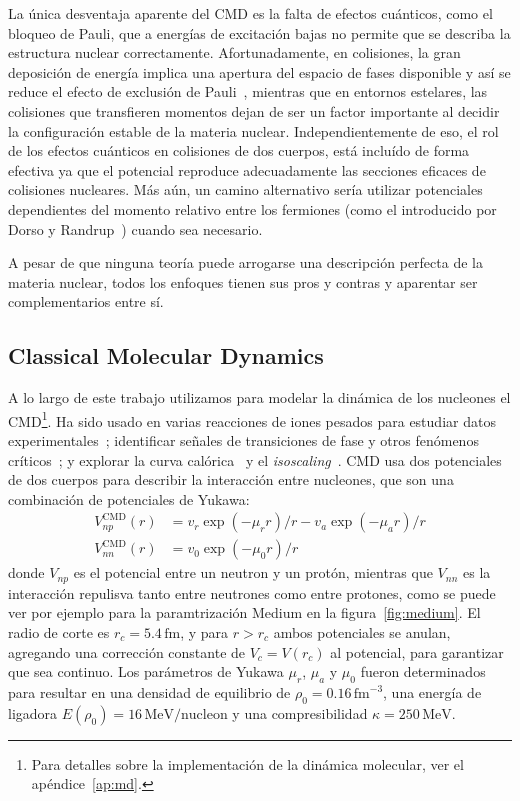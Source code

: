La única desventaja aparente del CMD es la falta de efectos cuánticos, como el bloqueo de Pauli, que a energías de excitación bajas no permite que se describa la estructura nuclear correctamente.
Afortunadamente, en colisiones, la gran deposición de energía implica una apertura del espacio de fases disponible y así se reduce el efecto de exclusión de Pauli~\cite{lopez_lectures_2000}, mientras que en entornos estelares, las colisiones que transfieren momentos dejan de ser un factor importante al decidir la configuración estable de la materia nuclear.
Independientemente de eso, el rol de los efectos cuánticos en colisiones de dos cuerpos, está incluído de forma efectiva ya que el potencial reproduce adecuadamente las secciones eficaces de colisiones nucleares.
Más aún, un camino alternativo sería utilizar potenciales dependientes del momento relativo entre los fermiones (como el introducido por Dorso y Randrup~\cite{dorso_classical_1988}) cuando sea necesario.

A pesar de que ninguna teoría puede arrogarse una descripción perfecta de la materia nuclear, todos los enfoques tienen sus pros y contras y aparentar ser complementarios entre sí.

\subsection{Classical Molecular Dynamics}\label{ssc:cmd}
A lo largo de este trabajo utilizamos para modelar la dinámica de los nucleones el CMD\footnote{Para detalles sobre la implementación de la dinámica molecular, ver el apéndice~\ref{ap:md}.}.
Ha sido usado en varias reacciones de iones pesados para estudiar datos experimentales~\cite{chernomoretz_quasiclassical_2002}; identificar señales de transiciones de fase y otros fenómenos críticos~\cite{lopez_lectures_2000, barranon_searching_2001, dorso_selection_2001, barranon_critical_2003, barranon_time_2007}; y explorar la curva calórica~\cite{barranon_entropy_2004} y el \emph{isoscaling}~\cite{dorso_dynamical_2006, dorso_isoscaling_2011}.
CMD usa dos potenciales de dos cuerpos para describir la interacción entre nucleones, que son una combinación de potenciales de Yukawa:
\begin{align*}
  V^{\text{CMD}}_{np}(r) &=v_{r}\exp(-\mu_{r}r)/{r}-v_{a}\exp(-\mu_{a}r)/{r}\\
  V^{\text{CMD}}_{nn}(r) &=v_{0}\exp(-\mu_{0}r)/{r}
\end{align*}
donde $V_{np}$ es el potencial entre un neutron y un protón, mientras que $V_{nn}$ es la interacción repulisva tanto entre neutrones como entre protones, como se puede ver por ejemplo para la paramtrización Medium en la figura~\ref{fig:medium}.
El radio de corte es $r_c=5.4\,\text{fm}$, y para $r>r_c$ ambos potenciales se anulan, agregando una corrección constante de $V_c = V(r_c)$ al potencial, para garantizar que sea continuo.
Los parámetros de Yukawa $\mu_r$, $\mu_a$ y $\mu_0$ fueron determinados para resultar en una densidad de equilibrio de $\rho_0=0.16\,\text{fm}^{-3}$, una energía de ligadora $E(\rho_0)=16\,\text{MeV/nucleon}$ y una compresibilidad $\kappa=250\,\text{MeV}$.

